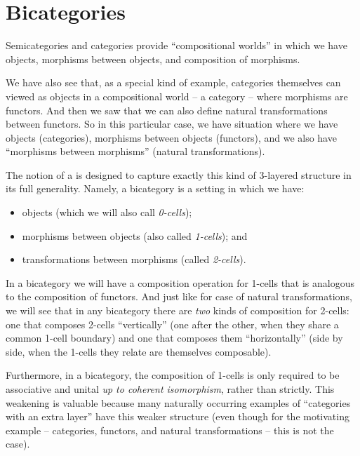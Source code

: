 
\section{Bicategories}
\label{sec:bicats-def}



Semicategories and categories provide ``compositional worlds'' in which we have objects, morphisms between objects, and composition of morphisms. 

We have also see that, as a special kind of example, categories themselves can viewed as objects in a compositional world -- a category -- where morphisms are functors. And then we saw that we can also define natural transformations between functors. So in this particular case, we have situation where we have objects (categories), morphisms between objects (functors), and we also have ``morphisms between morphisms'' (natural transformations).

The notion of a  is designed to capture exactly this kind of 3-layered structure in its full generality.
Namely, a bicategory is a setting in which we have:
\begin{itemize}
    \item objects (which we will also call \emph{0-cells});
    \item morphisms between objects (also called \emph{1-cells}); and
    \item transformations between morphisms (called \emph{2-cells}).
\end{itemize}

In a bicategory we will have a composition operation for 1-cells that is analogous to the composition of functors. And just like for case of natural transformations, we will see that in any bicategory there are \emph{two} kinds of composition for 2-cells: one that composes 2-cells ``vertically'' (one after the other, when they share a common 1-cell boundary) and one that composes them ``horizontally'' (side by side, when the 1-cells they relate are themselves composable).

Furthermore, in a bicategory, the composition of 1-cells is only required to be associative and unital \emph{up to coherent isomorphism}, rather than strictly. This weakening is valuable because many naturally occurring examples of ``categories with an extra layer'' have this weaker structure (even though for the motivating example -- categories, functors, and natural transformations -- this is not the case).

